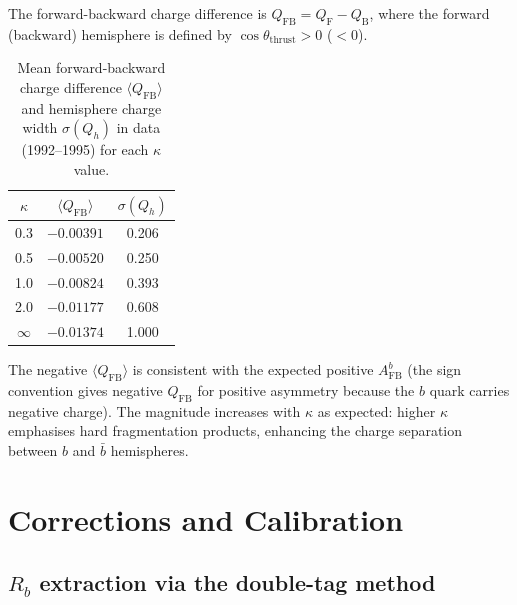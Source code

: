\documentclass[11pt,a4paper]{article}
\begin{document}
The forward-backward charge difference is
$Q_\text{FB} = Q_\text{F} - Q_\text{B}$,
where the forward (backward) hemisphere is defined by
$\cos\theta_\text{thrust} > 0$ ($< 0$).

\begin{table}[htbp]
\centering
\caption{Mean forward-backward charge difference $\langle Q_\text{FB}\rangle$
and hemisphere charge width $\sigma(Q_h)$ in data (1992--1995) for
each $\kappa$ value.}
\label{tbl:qfb}
\begin{tabular}{ccc}
\toprule
$\kappa$ & $\langle Q_\text{FB}\rangle$ & $\sigma(Q_h)$ \\
\midrule
0.3     & $-0.00391$ & 0.206 \\
0.5     & $-0.00520$ & 0.250 \\
1.0     & $-0.00824$ & 0.393 \\
2.0     & $-0.01177$ & 0.608 \\
$\infty$& $-0.01374$ & 1.000 \\
\bottomrule
\end{tabular}
\end{table}

The negative $\langle Q_\text{FB}\rangle$ is consistent with the
expected positive $A_\text{FB}^b$ (the sign convention gives
negative $Q_\text{FB}$ for positive asymmetry because the $b$
quark carries negative charge).
The magnitude increases with $\kappa$ as expected: higher $\kappa$
emphasises hard fragmentation products, enhancing the charge
separation between $b$ and $\bar{b}$ hemispheres.

\section{Corrections and Calibration}
\label{sec:corrections}

\subsection{$R_b$ extraction via the double-tag method}
\label{sec:corrections:Rb}
\end{document}
